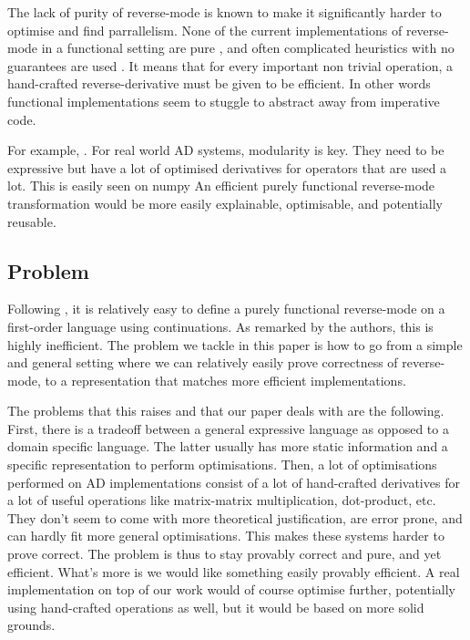 The lack of purity of reverse-mode is known to make it significantly harder to optimise and find parrallelism. 
None of the current implementations of reverse-mode in a functional setting are pure \cite{}, and often complicated heuristics with no guarantees are used \cite{}.
It means that for every important non trivial operation, a hand-crafted reverse-derivative must be given to be efficient.
In other words functional implementations seem to stuggle to abstract away from imperative code.

For example, .
For real world AD systems, modularity is key. They need to be expressive but have a lot of optimised derivatives for operators that are used a lot.
This is easily seen on numpy 
An efficient purely functional reverse-mode transformation would be more easily explainable, optimisable, and potentially reusable.

\subsection{Problem}

Following \cite{pearlmutter2008reverse}, it is relatively easy to define a purely functional reverse-mode on a first-order language using continuations. 
As remarked by the authors, this is highly inefficient. 
The problem we tackle in this paper is how to go from a simple and general setting where we can relatively easily prove correctness of reverse-mode, 
to a representation that matches more efficient implementations.

The problems that this raises and that our paper deals with are the following. First, there is a tradeoff between a general expressive language 
as opposed to a domain specific language. The latter usually has more static information and a specific representation to perform optimisations.
Then, a lot of optimisations performed on AD implementations consist of a lot of hand-crafted derivatives for a lot of useful operations like matrix-matrix multiplication, dot-product, etc.
They don't seem to come with more theoretical justification, are error prone, and can hardly fit more general optimisations.
This makes these systems harder to prove correct. The problem is thus to stay provably correct and pure, and yet efficient. What's more is we would like something easily provably efficient. 
A real implementation on top of our work would of course optimise further, potentially using hand-crafted operations as well, but it would be based on more solid grounds.



